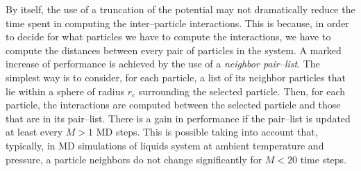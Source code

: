 By itself, the use of a truncation of the potential may not dramatically reduce the time spent in computing the
inter--particle interactions. This is because, in order to decide for what particles we have to compute the
interactions, we have to compute the distances between every pair of particles in the system. A marked increase
of performance is achieved by the use of a \textit{neighbor pair--list}. The simplest way is to consider, for
each particle, a list of its neighbor particles that lie within a sphere of radius $r_c$ surrounding the selected
particle. Then, for each particle, the interactions are computed between the selected particle and those that are
in its pair--list. There is a gain in performance if the pair--list is updated at least every $M>1$ \ac{MD}
steps. This is possible taking into account that, typically, in \ac{MD} simulations of liquids system at ambient
temperature and pressure, a particle neighbors do not change significantly for $M < 20$ time steps.

